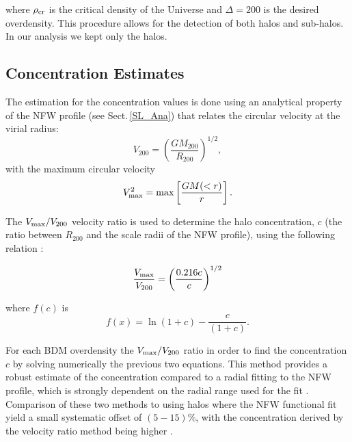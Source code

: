 \documentclass{article}
\begin{document}
where $\rho_{\rm cr}$ is the critical density of the Universe and
$\Delta=200$ is the desired overdensity. This procedure allows for the
detection of both halos and sub-halos. In our analysis we kept only
the halos. 

\subsection{Concentration Estimates}

The estimation for the concentration values is done using an
analytical property of the NFW profile (see Sect.\,\ref{SL_Ana}) that relates the circular
velocity at the virial radius:
\begin{equation}
V_{200} = \left(\frac{GM_{200}}{R_{200}}\right)^{1/2},
\end{equation}
with the maximum circular velocity 
\begin{equation}
V_{\rm max}^{2} = {\rm max}\left[\frac{GM(<r)}{r}\right].
\end{equation}


The $V_{\rm max}/V_{200}$ velocity ratio is used to determine the halo
concentration, $c$ (the ratio between $R_{200}$ and the scale radii of
the NFW profile), using the following relation \citep{Bolshoi}:

\begin{equation}
\frac{V_{\rm max}}{V_{200}} = \left(\frac{0.216 c}{c}\right)^{1/2}
\end{equation}

where $f(c)$ is
\begin{equation}
f(x) = \ln(1+c) - \frac{c}{(1+c)}.
\end{equation}

For each BDM overdensity the $V_{\rm max}/V_{200}$ ratio in order to
find the concentration $c$ by solving numerically the previous two
equations.  This method provides a robust estimate of the concentration
compared to a radial fitting to the NFW profile, which is strongly
dependent on the radial range used for the fit
\citep{Bolshoi,Meneghetti13}. Comparison of these two methods to
using halos where the NFW functional fit yield a small systematic
offset of $(5-15)\%$, with the concentration  derived by the velocity
ratio method being higher \citep{Prada12}.  



\end{document}
